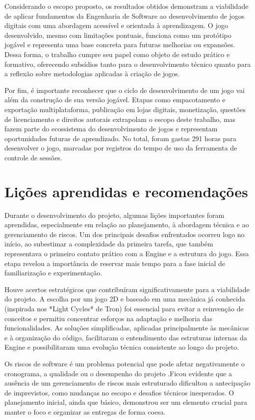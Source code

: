 Considerando o escopo proposto, os resultados obtidos demonstram a viabilidade de aplicar fundamentos da Engenharia de Software ao desenvolvimento de jogos digitais com uma abordagem acessível e orientada à aprendizagem. O jogo desenvolvido, mesmo com limitações pontuais, funciona como um protótipo jogável e representa uma base concreta para futuras melhorias ou expansões. Dessa forma, o trabalho cumpre seu papel como objeto de estudo prático e formativo, oferecendo subsídios tanto para o desenvolvimento técnico quanto para a reflexão sobre metodologias aplicadas à criação de jogos.

Por fim, é importante reconhecer que o ciclo de desenvolvimento de um jogo vai além da construção de sua versão jogável. Etapas como empacotamento e exportação multiplataforma, publicação em lojas digitais, monetização, questões de licenciamento e direitos autorais extrapolam o escopo deste trabalho, mas fazem parte do ecossistema do desenvolvimento de jogos e representam oportunidades futuras de aprendizado. No total, foram gastas 291 horas para desenvolver o jogo, marcadas por registros do tempo de uso da ferramenta de controle de sessões.


\section{Lições aprendidas e recomendações}

Durante o desenvolvimento do projeto, algumas lições importantes foram aprendidas, especialmente em relação ao planejamento, à abordagem técnica e ao gerenciamento de riscos. Um dos principais desafios enfrentados ocorreu logo no início, ao subestimar a complexidade da primeira tarefa, que também representava o primeiro contato prático com a Engine e a estrutura do jogo. Essa etapa revelou a importância de reservar mais tempo para a fase inicial de familiarização e experimentação.

Houve acertos estratégicos que contribuíram significativamente para a viabilidade do projeto. A escolha por um jogo 2D e baseado em uma mecânica já conhecida (inspirada nos *Light Cycles* de Tron) foi essencial para evitar a reinvenção de conceitos e permitiu concentrar esforços na adaptação e melhoria das funcionalidades. As soluções simplificadas, aplicadas principalmente às mecânicas e à organização do código, facilitaram o entendimento das estruturas internas da Engine e possibilitaram uma evolução técnica consistente ao longo do projeto.

Os riscos de software é um problema potencial que pode afetar negativamente o cronograma, a qualidade ou o desempenho do projeto \cite{pressman2016engenharia} \cite{pmbok2017}.Ficou evidente que a ausência de um gerenciamento de riscos mais estruturado dificultou a antecipação de imprevistos, como mudanças no escopo e desafios técnicos inesperados. O planejamento inicial, ainda que básico, demonstrou ser um elemento crucial para manter o foco e organizar as entregas de forma coesa.

